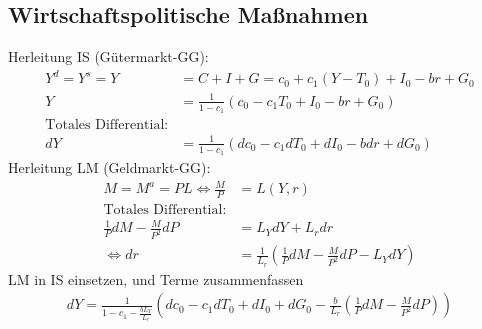\documentclass{scrartcl}
\begin{document}
\subsection{Wirtschaftspolitische Ma{\ss}nahmen}
Herleitung IS (G\"{u}termarkt-GG):
\begin{align*}
  Y^d=Y^s=Y &= C+I+G = c_{0} + c_1(Y-T_{0}) + I_{0}-br + G_{0}\\
  Y &= \frac{1}{1-c_1}(c_{0} - c_1T_{0} + I_{0}-br + G_{0})\\
  \text{Totales Differential:}\\
  dY &= \frac{1}{1-c_1}(dc_{0}-c_1 dT_{0} + dI_{0} - b dr + dG_{0})
\end{align*}
Herleitung LM (Geldmarkt-GG):
\begin{align*}
  M = M^a = P L \Leftrightarrow \frac{M}{P} &= L(Y,r)\\
  \text{Totales Differential:}\\
  \frac{1}{P}dM - \frac{M}{P^2}dP &= L_Y dY + L_r dr\\
  \Leftrightarrow dr &= \frac{1}{L_r} \left(\frac{1}{P}dM-\frac{M}{P^2}dP-L_Y dY\right)
\end{align*}
LM in IS einsetzen, und Terme zusammenfassen
\begin{align*}
  dY = \frac{1}{1-c_1 -\frac{b L_Y}{L_r}} \left(dc_{0} - c_1 dT_{0} + dI_{0} +dG_{0} - \frac{b}{L_r} \left(\frac{1}{P}dM-\frac{M}{P^2}dP\right)\right)
\end{align*}
\end{document}
